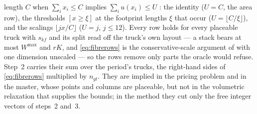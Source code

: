 length $C$ when $\sum_{i}x_{i}\le C$ implies $\sum_{i}u(x_{i})\le U$
\autocite{FeketeSchepers2001,Clautiaux2010Survey}: the identity
($U=C$, the area row), the thresholds $[x\ge\xi]$ at the footprint
lengths $\xi$ that occur ($U=\lfloor C/\xi\rfloor$), and the scalings
$\lfloor jx/C\rfloor$ ($U=j$, $j\le12$). Every row holds for every
placeable truck with $s_{kf}$ and its split read off the truck's own
layout --- a stack bears at most $W^{\max}$ and $rK$, and
\eqref{eq:fibrerows} is the conservative-scale argument of
\textcite{FeketeSchepers2004} with one dimension unscaled --- so the
rows remove only parts the oracle would refuse. Step~2 carries their
sum over the period's trucks, the right-hand sides of
\eqref{eq:fibrerows} multiplied by $n_{gt}$. They are implied in the
pricing problem and in the master, whose points and columns are
placeable, but not in the volumetric relaxation that supplies the
bounds; in the method they cut only the free integer vectors of
steps~2 and~3.
